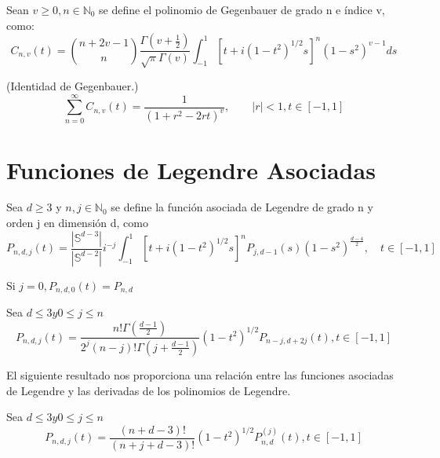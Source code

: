 \begin{defn}Sean $v\ge 0,n\in\mathds{N}_0$ se define el polinomio de Gegenbauer de grado n e índice v, como:
	$$C_{n,v}(t) = \binom{n+2v-1}{n}\frac{\Gamma(v+\frac{1}{2})}{\sqrt{\pi}\Gamma(v)}\int_{-1}^{1}\left[t+i(1-t^2)^{1/2}s\right]^n (1-s^2)^{v-1} ds$$ 
\end{defn}
\begin{prop}(Identidad de Gegenbauer.)$$
	\sum_{n=0}^{\infty} C_{n,v}(t) = \frac{1}{(1+r^2-2rt)^v}, \qquad |r|<1, t\in[-1,1]$$
\end{prop}
\chapter{Funciones de Legendre Asociadas}\label{aped.E}
\begin{defn}Sea $d\ge3$ y $n,j \in \mathds{N}_0$ se define la función asociada de Legendre de grado n y orden j en dimensión d, como
	$$
	P_{n,d,j}(t) = \frac{|\mathds{S}^{d-3}|}{|\mathds{S}^{d-2}|}i^{-j} \int_{-1}^{1}\left[t+i(1-t^2)^{1/2}s\right]^n P_{j,d-1}(s)(1-s^2)^{\frac{d-4}{2}}, \quad t\in[-1,1]
	$$
\end{defn}
\begin{rem}Si $j=0, P_{n,d,0}(t)=P_{n,d}$
\end{rem}
\begin{prop}Sea $d\le3 y 0\le j \le n$ 
	$$	P_{n,d,j}(t) = \frac{n!\Gamma(\frac{d-1}{2})}{2^j(n-j)!\Gamma(j+\frac{d-1}{2})}(1-t^2)^{1/2} P_{n-j,d+2j}(t), t\in[-1,1]$$
\end{prop}
El siguiente resultado nos proporciona una relación entre las funciones asociadas de Legendre y las derivadas de los polinomios de Legendre.
\begin{prop}Sea $d\le3 y 0\le j \le n$ 
	$$	P_{n,d,j}(t) = \frac{(n+d-3)!}{(n+j+d-3)!}(1-t^2)^{1/2} P^{(j)}_{n,d}(t), t\in[-1,1]$$
\end{prop}
